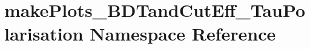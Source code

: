 \hypertarget{namespacemakePlots__BDTandCutEff__TauPolarisation}{
\section{makePlots\_\-BDTandCutEff\_\-TauPolarisation Namespace Reference}
\label{namespacemakePlots__BDTandCutEff__TauPolarisation}
}
